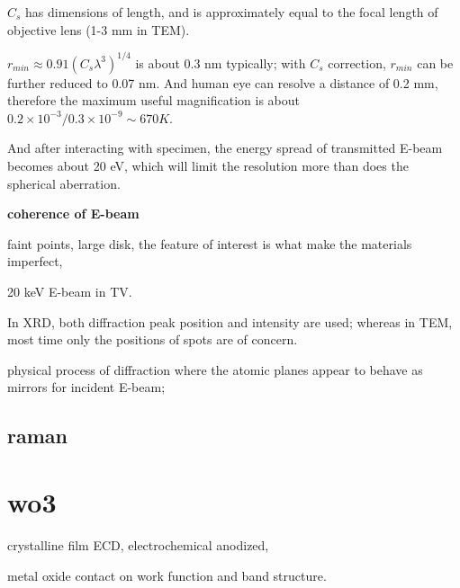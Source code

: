 $C_s$ has dimensions of length, and is approximately equal to the focal length of objective lens (1-3 mm in TEM). 

$r_{min} \approx 0.91(C_s \lambda^3)^{1/4}$ is about 0.3 nm typically; with $C_s$ correction, $r_{min}$ can be further reduced to 0.07 nm. And human eye can resolve a distance of 0.2 mm, therefore the maximum useful magnification is about $0.2 \times 10^{-3}/0.3 \times 10^{-9} \sim 670 K$. 

And after interacting with specimen, the energy spread of transmitted E-beam becomes about 20 eV, which will limit the resolution more than does the spherical aberration. 

\textbf{coherence of E-beam}

faint points, large disk, the feature of interest is what make the materials imperfect, 

20 keV E-beam in TV. 

In XRD, both diffraction peak position and intensity are used; whereas in TEM, most time only the positions of spots are of concern. 

physical process of diffraction where the atomic planes appear to behave as mirrors for incident E-beam; 

\fi

\section{raman}


\iffalse
A Raman pattern database can be found at \url{http://wwwobs.univ-bpclermont.fr/sfmc/ramandb2/index.html}. 
In analytical practice, frequency is expressed in reciprocal wavelength (as cm−1), called wavenumbers;
\fi


\chapter{wo3}

\iffalse
The author believe the resolution to a large extent depends on the phase transitions, as discussed in Section.~\ref{sec:wonawo}.

A thin film example on the valency number, color center density. some calculation on doping, uv-vis results on the thin film. 

\fi

 crystalline film ECD, electrochemical anodized, \cite{Ou2012}

metal oxide contact on work function and band structure.\cite{Greiner2013}

